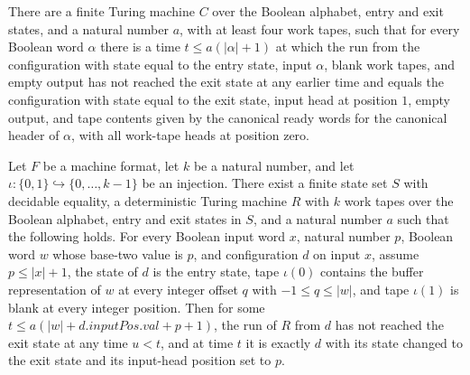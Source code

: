 \begin{lemma}
\label{Turing.MachineFormat.exists_canonReadySeam}
\leanok
{}
There are a finite Turing machine $C$ over the Boolean alphabet, entry and exit states,
and a natural number $a$, with at least four work tapes, such that for every Boolean
word $\alpha$ there is a time $t\le a(|\alpha|+1)$ at which the run from the
configuration with state equal to the entry state, input $\alpha$, blank work tapes, and
empty output has not reached the exit state at any earlier time and equals the
configuration with state equal to the exit state, input head at position $1$, empty
output, and tape contents given by the canonical ready words for the canonical header of
$\alpha$, with all work-tape heads at position zero.
\end{lemma}

\begin{lemma}
\label{Turing.MachineFormat.exists_canonSeekOnBank}
\leanok
{}
Let $F$ be a machine format, let $k$ be a natural number, and let
$\iota:\{0,1\}\hookrightarrow\{0,\ldots,k-1\}$ be an injection. There exist a finite
state set $S$ with decidable equality, a deterministic Turing machine $R$ with $k$ work
tapes over the Boolean alphabet, entry and exit states in $S$, and a natural number $a$
such that the following holds. For every Boolean input word $x$, natural number $p$,
Boolean word $w$ whose base-two value is $p$, and configuration $d$ on input $x$, assume
$p\le |x|+1$, the state of $d$ is the entry state, tape $\iota(0)$ contains the buffer
representation of $w$ at every integer offset $q$ with $-1\le q\le |w|$, and tape
$\iota(1)$ is blank at every integer position. Then for some $t\le
a(|w|+d.inputPos.val+p+1)$, the run of $R$ from $d$ has not reached the exit state at
any time $u<t$, and at time $t$ it is exactly $d$ with its state changed to the exit
state and its input-head position set to $p$.
\end{lemma}

